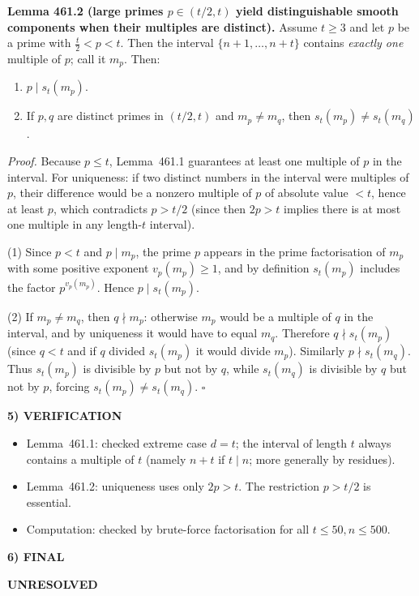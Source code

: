 \medskip
\noindent\textbf{Lemma 461.2 (large primes $p\in(t/2,t)$ yield distinguishable smooth components when their multiples are distinct).}
Assume $t\ge 3$ and let $p$ be a prime with $\tfrac{t}{2}<p<t$. Then the interval $\{n+1,\dots,n+t\}$ contains \emph{exactly one} multiple of $p$; call it $m_p$. Then:
\begin{enumerate}
\item $p\mid s_t(m_p)$.
\item If $p,q$ are distinct primes in $(t/2,t)$ and $m_p\neq m_q$, then $s_t(m_p)\neq s_t(m_q)$.
\end{enumerate}

\textit{Proof.}
Because $p\le t$, Lemma~461.1 guarantees at least one multiple of $p$ in the interval. For uniqueness: if two distinct numbers in the interval were multiples of $p$, their difference would be a nonzero multiple of $p$ of absolute value $<t$, hence at least $p$, which contradicts $p>t/2$ (since then $2p>t$ implies there is at most one multiple in any length-$t$ interval).

(1) Since $p<t$ and $p\mid m_p$, the prime $p$ appears in the prime factorisation of $m_p$ with some positive exponent $v_p(m_p)\ge 1$, and by definition $s_t(m_p)$ includes the factor $p^{v_p(m_p)}$. Hence $p\mid s_t(m_p)$.

(2) If $m_p\neq m_q$, then $q\nmid m_p$: otherwise $m_p$ would be a multiple of $q$ in the interval, and by uniqueness it would have to equal $m_q$. Therefore $q\nmid s_t(m_p)$ (since $q<t$ and if $q$ divided $s_t(m_p)$ it would divide $m_p$). Similarly $p\nmid s_t(m_q)$. Thus $s_t(m_p)$ is divisible by $p$ but not by $q$, while $s_t(m_q)$ is divisible by $q$ but not by $p$, forcing $s_t(m_p)\neq s_t(m_q)$. \hfill$\square$

\medskip
\noindent\textbf{5) VERIFICATION}

\begin{itemize}
\item Lemma~461.1: checked extreme case $d=t$; the interval of length $t$ always contains a multiple of $t$ (namely $n+t$ if $t\mid n$; more generally by residues).
\item Lemma~461.2: uniqueness uses only $2p>t$. The restriction $p>t/2$ is essential.
\item Computation: checked by brute-force factorisation for all $t\le 50, n\le 500$.
\end{itemize}

\noindent\textbf{6) FINAL}

\textbf{UNRESOLVED}

